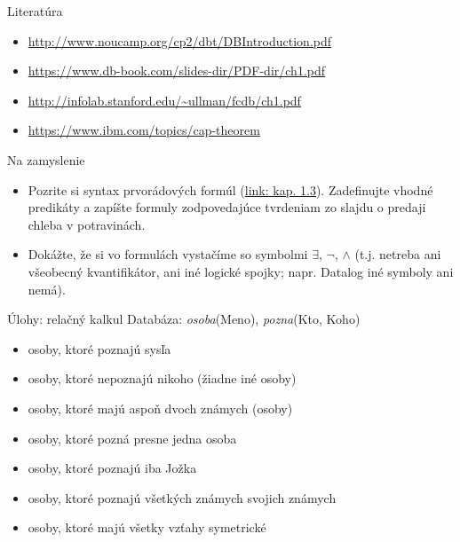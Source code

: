 \documentclass[12pt]{beamer}
\begin{document}
\begin{frame}{Literatúra}
\begin{itemize}
\item {\scriptsize\url{http://www.noucamp.org/cp2/dbt/DBIntroduction.pdf}}
\item {\scriptsize\url{https://www.db-book.com/slides-dir/PDF-dir/ch1.pdf}}
\item {\scriptsize\url{http://infolab.stanford.edu/~ullman/fcdb/ch1.pdf}}
\item {\scriptsize\url{https://www.ibm.com/topics/cap-theorem}}
\end{itemize}
\end{frame}


\begin{frame}{Na zamyslenie}
\begin{itemize}
\item Pozrite si syntax prvorádových formúl (\href{http://www.dcs.fmph.uniba.sk/texty/dsmain.pdf}{link: kap. 1.3}).
    Zadefinujte vhodné predikáty a zapíšte formuly zodpovedajúce tvrdeniam zo slajdu o predaji chleba v potravinách.
\item Dokážte, že si vo formulách vystačíme so symbolmi $\exists$, $\lnot$, $\land$
    (t.j. netreba ani všeobecný kvantifikátor, ani iné logické spojky; napr. Datalog iné symboly ani nemá).
\end{itemize}
\end{frame}


\begin{frame}{Úlohy: relačný kalkul}
Databáza: \emph{osoba}(Meno), \emph{pozna}(Kto, Koho)
\begin{itemize}
    \item osoby, ktoré poznajú sysľa
    \item osoby, ktoré nepoznajú nikoho (žiadne iné osoby)
    \item osoby, ktoré majú aspoň dvoch známych (osoby)
    \item osoby, ktoré pozná presne jedna osoba
    \item osoby, ktoré poznajú iba Jožka
    \item osoby, ktoré poznajú všetkých známych svojich známych
    \item osoby, ktoré majú všetky vzťahy symetrické
\end{itemize}
\end{frame}
\end{document}
